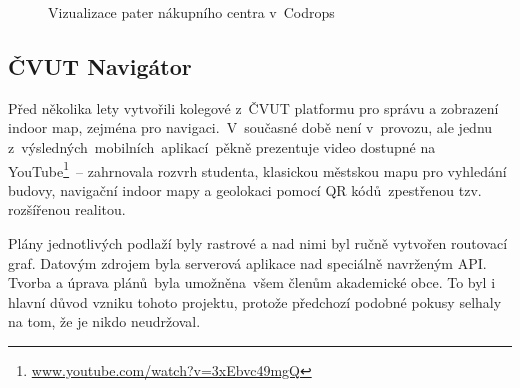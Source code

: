                      \begin{figure}
                    
                    \hfill

                    \caption{Vizualizace pater nákupního centra v~Codrops}
                    \label{obr7}
                    \end{figure}
                    

\subsection{ČVUT Navigátor}\label{ux10dvut-naviguxe1tor}

Před několika lety vytvořili kolegové z~ČVUT platformu pro správu a zobrazení indoor map, zejména pro navigaci.\cite{zdroj27}~V~současné době není v~provozu, ale jednu z~výsledných~mobilních~aplikací~pěkně prezentuje video dostupné na YouTube\footnote{\href{https://www.youtube.com/watch?v=3xEbvc49mgQ}{www.youtube.com/watch?v=3xEbvc49mgQ}}~-- zahrnovala rozvrh studenta, klasickou městskou mapu pro vyhledání budovy, navigační indoor mapy a geolokaci pomocí QR kódů~zpestřenou tzv. rozšířenou realitou.

Plány jednotlivých podlaží byly rastrové a nad nimi byl ručně vytvořen routovací graf. Datovým zdrojem byla serverová aplikace nad speciálně navrženým API. Tvorba a úprava plánů~byla umožněna~všem členům akademické obce. To byl i hlavní důvod vzniku tohoto projektu, protože předchozí podobné pokusy selhaly na tom, že je nikdo neudržoval.

